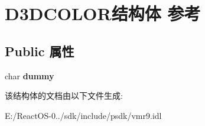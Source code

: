 \hypertarget{struct_d3_d_c_o_l_o_r}{}\section{D3\+D\+C\+O\+L\+O\+R结构体 参考}
\label{struct_d3_d_c_o_l_o_r}
\subsection*{Public 属性}
\begin{DoxyCompactItemize}
\item 
\mbox{\label{struct_d3_d_c_o_l_o_r_a23940e64eb66bad531c2d4bd9405b134}} 
char {\bfseries dummy}
\end{DoxyCompactItemize}


该结构体的文档由以下文件生成\+:\begin{DoxyCompactItemize}
\item 
E\+:/\+React\+O\+S-\/0../sdk/include/psdk/vmr9.\+idl\end{DoxyCompactItemize}
